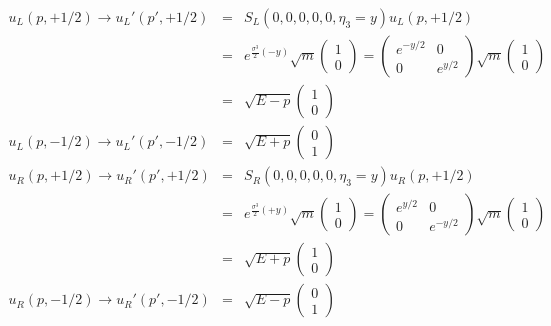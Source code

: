 \documentclass[12pt]{article}
\begin{document}
\begin{eqnarray}
  u_L(p,+1/2) \to u_L'(p',+1/2)
  &=& S_L(0,0,0,0,0,\eta_3=y) u_L(p,+1/2) \\
  &=& e^{ \frac{\sigma^3}{2} (-y) } \sqrt{m}
  \begin{pmatrix}
    1\\0
  \end{pmatrix}
  =
  \begin{pmatrix}
    e^{-y/2} & 0\\
    0 & e^{y/2}
  \end{pmatrix}
  \sqrt{m}
  \begin{pmatrix}
    1\\0
  \end{pmatrix}\\
 &=&\sqrt{E-p}   
  \begin{pmatrix}
    1\\0
  \end{pmatrix} \label{eq.14_41a} \\
  u_L(p,-1/2) \to u_L'(p',-1/2)&=& \sqrt{E+p} 
  \begin{pmatrix}
    0 \\ 1
  \end{pmatrix} \label{eq.14_41b} \\
  u_R(p,+1/2) \to u_R'(p',+1/2) &=& 
  S_R(0,0,0,0,0,\eta_3=y) u_R(p,+1/2) \\
  &=& e^{ \frac{\sigma^3}{2} (+y) } \sqrt{m}
  \begin{pmatrix}
  1\\0
  \end{pmatrix} 
  = 
  \begin{pmatrix}
  e^{y/2} & 0\\
  0 & e^{-y/2}
\end{pmatrix}
\sqrt{m}
\begin{pmatrix}
  1\\0
\end{pmatrix}\\
  &=& \sqrt{E+p} 
  \begin{pmatrix}
  1\\0
\end{pmatrix} \label{eq.14_41c} \\
u_R(p,-1/2) \to u_R'(p',-1/2)&=& \sqrt{E-p} 
  \begin{pmatrix}
  0 \\ 1
\end{pmatrix} \label{eq.14_41d}                                
\end{eqnarray}
  
\end{document}

